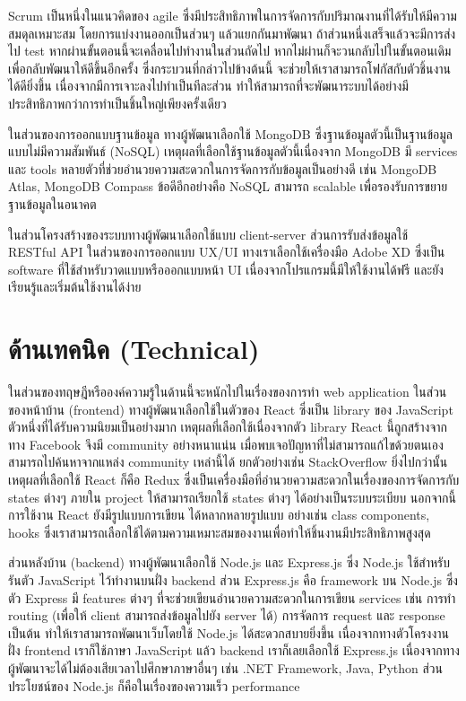 Scrum เป็นหนึ่งในแนวคิดของ agile ซึ่งมีประสิทธิภาพในการจัดการกับปริมาณงานที่ได้รับให้มีความสมดุลเหมาะสม  โดยการแบ่งงานออกเป็นส่วนๆ แล้วแยกกันมาพัฒนา  ถ้าส่วนหนึ่งเสร็จแล้วจะมีการส่งไป test  หากผ่านขั้นตอนนี้จะเคลื่อนไปทำงานในส่วนถัดไป  หากไม่ผ่านก็จะวนกลับไปในขั้นตอนเดิมเพื่อกลับพัฒนาให้ดีขึ้นอีกครั้ง ซึ่งกระบวนที่กล่าวไปข้างต้นนี้  จะช่วยให้เราสามารถโฟกัสกับตัวชิ้นงานได้ดียิ่งขึ้น เนื่องจากมีการเจาะลงไปทำเป็นทีละส่วน ทำให้สามารถที่จะพัฒนาระบบได้อย่างมีประสิทธิภาพกว่าการทำเป็นชิ้นใหญ่เพียงครั้งเดียว


ในส่วนของการออกแบบฐานข้อมูล ทางผู้พัฒนาเลือกใช้ MongoDB \cite{MongoDB} ซึ่งฐานข้อมูลตัวนี้เป็นฐานข้อมูลแบบไม่มีความสัมพันธ์ (NoSQL) 
เหตุผลที่เลือกใช้ฐานข้อมูลตัวนี้เนื่องจาก MongoDB มี services และ tools หลายตัวที่ช่วยอำนวยความสะดวกในการจัดการกับข้อมูลเป็นอย่างดี เช่น MongoDB Atlas, MongoDB Compass 
ข้อดีอีกอย่างคือ NoSQL สามารถ scalable เพื่อรองรับการขยายฐานข้อมูลในอนาคต 

ในส่วนโครงสร้างของระบบทางผู้พัฒนาเลือกใช้แบบ client-server \cite{Client-Server} ส่วนการรับส่งข้อมูลใช้ RESTful API \cite{RESTFUL}
ในส่วนของการออกแบบ UX/UI ทางเราเลือกใช้เครื่องมือ Adobe XD \cite{AdobeXD} ซึ่งเป็น software ที่ใช้สำหรับวาดแบบหรือออกแบบหน้า UI เนื่องจากโปรแกรมนี้มีให้ใช้งานได้ฟรี และยังเรียนรู้และเริ่มต้นใช้งานได้ง่าย 
  

\section{ด้านเทคนิค (Technical)}
ในส่วนของทฤษฎีหรือองค์ความรู้ในด้านนี้จะหนักไปในเรื่องของการทำ
web application ในส่วนของหน้าบ้าน (frontend) ทางผู้พัฒนาเลือกใช้ในตัวของ
React \cite{React} ซึ่งเป็น library ของ JavaScript ตัวหนึ่งที่ได้รับความนิยมเป็นอย่างมาก เหตุผลที่เลือกใช้เนื่องจากตัว library React นี้ถูกสร้างจากทาง Facebook 
จึงมี community อย่างหนาแน่น  เมื่อพบเจอปัญหาที่ไม่สามารถแก้ไขด้วยตนเอง สามารถไปค้นหาจากแหล่ง community เหล่านี้ได้ ยกตัวอย่างเช่น StackOverflow 
ยิ่งไปกว่านั้น เหตุผลที่เลือกใช้ React ก็คือ Redux \cite{Redux} ซึ่งเป็นเครื่องมือที่อำนวยความสะดวกในเรื่องของการจัดการกับ states ต่างๆ  ภายใน project ให้สามารถเรียกใช้ states ต่างๆ ได้อย่างเป็นระบบระเบียบ นอกจากนี้ การใช้งาน React ยังมีรูปแบบการเขียน
ได้หลากหลายรูปแบบ อย่างเช่น class components, hooks ซึ่งเราสามารถเลือกใช้ได้ตามความเหมาะสมของงานเพื่อทำให้ชิ้นงานมีประสิทธิภาพสูงสุด


ส่วนหลังบ้าน (backend) ทางผู้พัฒนาเลือกใช้ Node.js \cite{NodeJs}
และ Express.js \cite{Express} ซึ่ง Node.js ใช้สำหรับรันตัว JavaScript ไว้ทำงานบนฝั่ง backend ส่วน Express.js คือ  framework บน Node.js 
ซึ่งตัว Express มี features ต่างๆ  ที่จะช่วยเขียนอำนวยความสะดวกในการเขียน services เช่น การทำ routing (เพื่อให้ client สามารถส่งข้อมูลไปยัง server ได้) การจัดการ request และ response เป็นต้น  ทำให้เราสามารถพัฒนาเว็บโดยใช้ Node.js ได้สะดวกสบายยิ่งขึ้น
เนื่องจากทางตัวโครงงานฝั่ง frontend เราก็ใช้ภาษา JavaScript แล้ว backend เราก็เลยเลือกใช้ Express.js  เนื่องจากทางผู้พัฒนาจะได้ไม่ต้องเสียเวลาไปศึกษาภาษาอื่นๆ เช่น .NET Framework, Java, Python 
ส่วนประโยชน์ของ Node.js ก็คือในเรื่องของความเร็ว performance 

